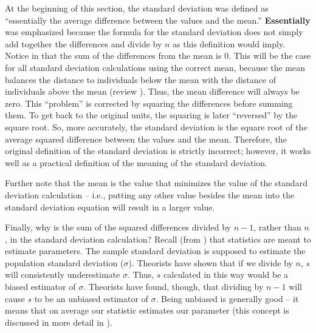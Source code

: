 \documentclass[10pt,openany]{book}\usepackage[]{graphicx}\usepackage[]{color}
\begin{document}

At the beginning of this section, the standard deviation was defined as ``essentially the average difference between the values and the mean.'' \textbf{Essentially} was emphasized because the formula for the standard deviation does not simply add together the differences and divide by $n$ as this definition would imply.  Notice in  that the sum of the differences from the mean is 0.  This will be the case for all standard deviation calculations using the correct mean, because the mean balances the distance to individuals below the mean with the distance of individuals above the mean (review ).  Thus, the mean difference will always be zero.  This ``problem'' is corrected by squaring the differences before summing them.  To get back to the original units, the squaring is later ``reversed'' by the square root.  So, more accurately, the standard deviation is the square root of the average squared difference between the values and the mean.  Therefore, the original definition of the standard deviation is strictly incorrect; however, it works well as a practical definition of the meaning of the standard deviation.


Further note that the mean is the value that minimizes the value of the standard deviation calculation -- i.e., putting any other value besides the mean into the standard deviation equation will result in a larger value.

Finally, why is the sum of the squared differences divided by $n-1$, rather than $n$, in the standard deviation calculation?  Recall (from ) that statistics are meant to estimate parameters.  The sample standard deviation is supposed to estimate the population standard deviation ($\sigma$).  Theorists have shown that if we divide by $n$, $s$ will consistently underestimate $\sigma$.  Thus, $s$ calculated in this way would be a biased estimator of $\sigma$.  Theorists have found, though, that dividing by $n-1$ will cause $s$ to be an unbiased estimator of $\sigma$.  Being unbiased is generally good -- it means that on average our statistic estimates our parameter (this concept is discussed in more detail in ).
\end{document}
